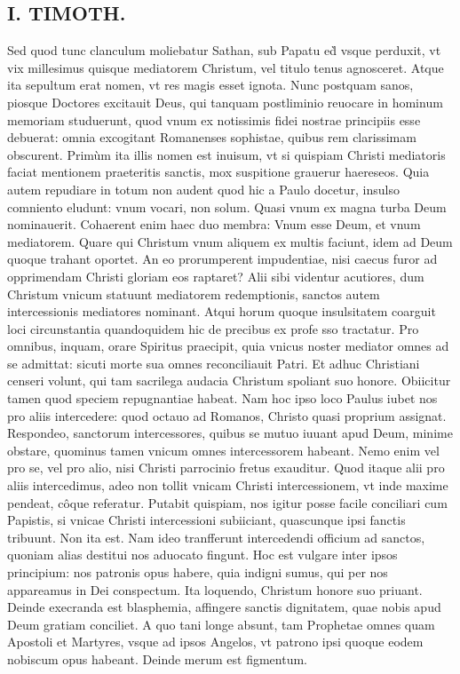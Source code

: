 \documentclass{article}
\begin{document}
\begin{pages}
\section*{I. TIMOTH. }
\marginpar{[ p.22 ]}\pstart Sed quod tunc clanculum moliebatur Sathan, sub Papatu ed̀ vsque perduxit, vt vix millesimus quisque mediatorem Christum, vel titulo tenus agnosceret. Atque ita sepultum erat nomen, vt res magis esset ignota. Nunc postquam sanos, piosque Doctores excitauit Deus, qui tanquam postliminio reuocare in hominum memoriam studuerunt, quod vnum ex notissimis fidei nostrae principiis esse debuerat: omnia excogitant Romanenses sophistae, quibus rem clarissimam obscurent. Primùm ita illis nomen est inuisum, vt si quispiam Christi mediatoris faciat mentionem praeteritis sanctis, mox suspitione grauerur haereseos. Quia autem repudiare in totum non audent quod hic a Paulo docetur, insulso comniento eludunt: vnum vocari, non solum. Quasi vnum ex magna turba Deum nominauerit. Cohaerent enim haec duo membra: Vnum esse Deum, et vnum mediatorem. Quare qui Christum vnum aliquem ex multis faciunt, idem ad Deum quoque trahant oportet. An eo prorumperent impudentiae, nisi caecus furor ad opprimendam Christi gloriam eos raptaret? Alii sibi videntur acutiores, dum Christum vnicum statuunt mediatorem redemptionis, sanctos autem intercessionis mediatores nominant. Atqui horum quoque insulsitatem coarguit loci circunstantia quandoquidem hic de precibus ex profe sso tractatur. Pro omnibus, inquam, orare Spiritus praecipit, quia vnicus noster mediator omnes ad se admittat: sicuti morte sua omnes reconciliauit Patri. Et adhuc Christiani censeri volunt, qui tam sacrilega audacia Christum spoliant suo honore. Obiicitur tamen quod speciem repugnantiae habeat. Nam hoc ipso loco Paulus iubet nos pro aliis intercedere: quod octauo ad Romanos, Christo quasi proprium assignat. Respondeo, sanctorum intercessores, quibus se mutuo iuuant apud Deum, minime obstare, quominus tamen vnicum omnes intercessorem habeant. Nemo enim vel pro se, vel pro alio, nisi Christi parrocinio fretus exauditur. Quod itaque alii pro aliis intercedimus, adeo non tollit vnicam Christi intercessionem, vt inde maxime pendeat, côque referatur. Putabit quispiam, nos igitur posse facile conciliari cum Papistis, si vnicae Christi intercessioni subiiciant, quascunque ipsi fanctis tribuunt. Non ita est. Nam ideo tranfferunt intercedendi officium ad sanctos, quoniam alias destitui nos aduocato fingunt. Hoc est vulgare inter ipsos principium: nos patronis opus habere, quia indigni sumus, qui per nos appareamus in Dei conspectum. Ita loquendo, Christum honore suo priuant. Deinde execranda est blasphemia, affingere sanctis dignitatem, quae nobis apud Deum gratiam conciliet. A quo tani longe absunt, tam Prophetae omnes quam Apostoli et Martyres, vsque ad ipsos Angelos, vt patrono ipsi quoque eodem nobiscum opus habeant. Deinde merum est figmentum.  \pend

\end{pages}
\end{document}

